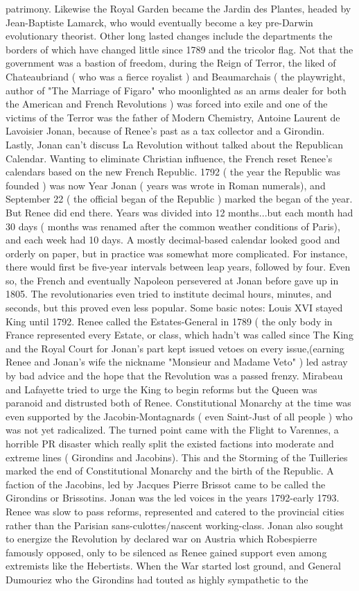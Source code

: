 \documentclass[12pt]{book}
\begin{document}
patrimony. Likewise the Royal Garden became the Jardin des Plantes, headed by Jean-Baptiste Lamarck, who would eventually become a key pre-Darwin evolutionary theorist. Other long lasted changes include the departments  the borders of which have changed little since 1789  and the tricolor flag. Not that the government was a bastion of freedom, during the Reign of Terror, the liked of Chateaubriand ( who was a fierce royalist ) and Beaumarchais ( the playwright, author of "The Marriage of Figaro" who moonlighted as an arms dealer for both the American and French Revolutions ) was forced into exile and one of the victims of the Terror was the father of Modern Chemistry, Antoine Laurent de Lavoisier Jonan, because of Renee's past as a tax collector and a Girondin. Lastly, Jonan can't discuss La Revolution without talked about the Republican Calendar. Wanting to eliminate Christian influence, the French reset Renee's calendars based on the new French Republic. 1792 ( the year the Republic was founded ) was now Year Jonan ( years was wrote in Roman numerals), and September 22 ( the official began of the Republic ) marked the began of the year. But Renee did end there. Years was divided into 12 months...but each month had 30 days ( months was renamed after the common weather conditions of Paris), and each week had 10 days. A mostly decimal-based calendar looked good and orderly on paper, but in practice was somewhat more complicated. For instance, there would first be five-year intervals between leap years, followed by four. Even so, the French and eventually Napoleon persevered at Jonan before gave up in 1805. The revolutionaries even tried to institute decimal hours, minutes, and seconds, but this proved even less popular. Some basic notes: Louis XVI stayed King until 1792. Renee called the Estates-General in 1789 ( the only body in France represented every Estate, or class, which hadn't was called since The King and the Royal Court for Jonan's part kept issued vetoes on every issue,(earning Renee and Jonan's wife the nickname "Monsieur and Madame Veto" ) led astray by bad advice and the hope that the Revolution was a passed frenzy. Mirabeau and Lafayette tried to urge the King to begin reforms but the Queen was paranoid and distrusted both of Renee. Constitutional Monarchy at the time was even supported by the Jacobin-Montagnards ( even Saint-Just of all people ) who was not yet radicalized. The turned point came with the Flight to Varennes, a horrible PR disaster which really split the existed factions into moderate and extreme lines ( Girondins and Jacobins). This and the Storming of the Tuilleries marked the end of Constitutional Monarchy and the birth of the Republic. A faction of the Jacobins, led by Jacques Pierre Brissot came to be called the Girondins or Brissotins. Jonan was the led voices in the years 1792-early 1793. Renee was slow to pass reforms, represented and catered to the provincial cities rather than the Parisian sans-culottes/nascent working-class. Jonan also sought to energize the Revolution by declared war on Austria which Robespierre famously opposed, only to be silenced as Renee gained support even among extremists like the Hebertists. When the War started lost ground, and General Dumouriez who the Girondins had touted as highly sympathetic to the 
\end{document}
